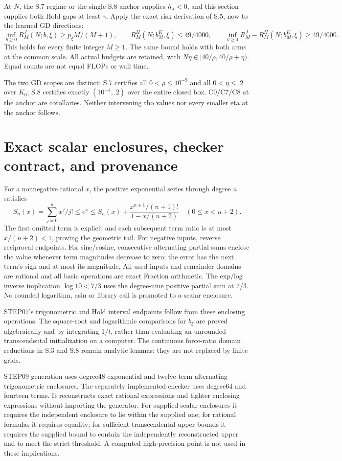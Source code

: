 \documentclass[11pt,a4paper]{article}
\begin{document}
At $N$, the S.7 regime or the single S.8 anchor supplies $h_J<0$, and this section supplies both Hold gaps at least $\gamma$. Apply the exact risk derivation of S.5, now to the learned GD directions:
\[
 \inf_{b\ge0}R_M^J(N;b,\xi)\ge p_\xi M/(M+1),\qquad
 R_M^H(N;b_M^K,\xi)\le49/4000,\qquad
 \inf_{b\ge0}R_M^J-R_M^H(N;b_M^K,\xi)\ge49/4000 .
\]
This holds for every finite integer $M\ge1$. The same bound holds with both arms at the common scale. All actual budgets are retained, with $N\eta\in[40/\rho,40/\rho+\eta)$. Equal counts are not equal FLOPs or wall time.

The two GD scopes are distinct: S.7 certifies all $0<\rho\le10^{-9}$ and all $0<\eta\le.2$ over $K_0$; S.8 certifies exactly $(10^{-4},.2)$ over the entire closed box. C0/C7/C8 at the anchor are corollaries. Neither intervening rho values nor every smaller eta at the anchor follows.

\section{Exact scalar enclosures, checker contract, and provenance}

For a nonnegative rational $x$, the positive exponential series through degree $n$ satisfies
\[
 S_n(x)=\sum_{j=0}^n x^j/j!\le e^x
 \le S_n(x)+\frac{x^{n+1}/(n+1)!}{1-x/(n+2)}
 \quad(0\le x<n+2).
\]
The first omitted term is explicit and each subsequent term ratio is at most $x/(n+2)<1$, proving the geometric tail. For negative inputs, reverse reciprocal endpoints. For sine/cosine, consecutive alternating partial sums enclose the value whenever term magnitudes decrease to zero; the error has the next term's sign and at most its magnitude. All used inputs and remainder domains are rational and all basic operations are exact Fraction arithmetic. The exp/log inverse implication $\log10<7/3$ uses the degree-nine positive partial sum at $7/3$. No rounded logarithm, asin or library call is promoted to a scalar enclosure.

STEP07's trigonometric and Hold interval endpoints follow from these enclosing operations. The square-root and logarithmic comparisons for $b_\xi$ are proved algebraically and by integrating $1/t$, rather than evaluating an unrounded transcendental initialization on a computer. The continuous force-ratio domain reductions in S.3 and S.8 remain analytic lemmas; they are not replaced by finite grids.

STEP09 generation uses degree48 exponential and twelve-term alternating trigonometric enclosures. The separately implemented checker uses degree64 and fourteen terms. It reconstructs exact rational expressions and tighter enclosing expressions without importing the generator. For supplied scalar enclosures it requires the independent enclosure to lie within the supplied one; for rational formulas it requires equality; for sufficient transcendental upper bounds it requires the supplied bound to contain the independently reconstructed upper and to meet the strict threshold. A computed high-precision point is not used in these implications.
\end{document}
